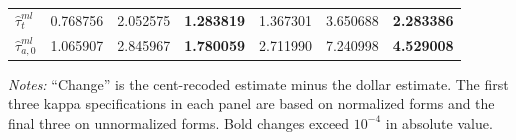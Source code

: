\documentclass[12pt, a4paper, oneside]{article}
\theoremstyle{plain}
\theoremstyle{definition}
\begin{document}
\begin{table}[H]
\begin{threeparttable}
\begin{tabular}{@{}lrrr rrr@{}}
$\hat{\tau}^{ml}_{t}$
& 0.768756 & 2.052575 & \textbf{1.283819}
& 1.367301 & 3.650688 & \textbf{2.283386} \\
$\hat{\tau}^{ml}_{a,0}$
& 1.065907 & 2.845967 & \textbf{1.780059}
& 2.711990 & 7.240998 & \textbf{4.529008} \\
\bottomrule
\end{tabular}
\begin{tablenotes}
\footnotesize
\item \textit{Notes:} ``Change'' is the cent-recoded estimate minus the
dollar estimate. The first three kappa specifications in each panel are based
on normalized forms and the final three on unnormalized forms. Bold changes exceed \(10^{-4}\) in
absolute value.
\end{tablenotes}
\end{threeparttable}
\end{table}
\end{document}
